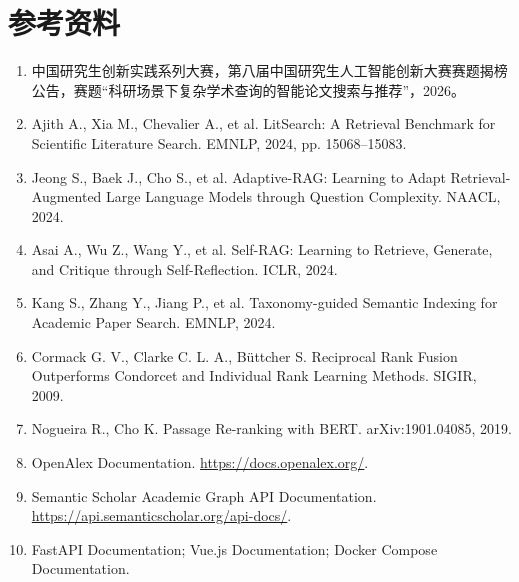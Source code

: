 \documentclass[a4paper,12pt,fontset=none]{ctexart}
\begin{document}
\clearpage
\section{参考资料}
{\small\begin{enumerate}
  \item 中国研究生创新实践系列大赛，第八届中国研究生人工智能创新大赛赛题揭榜公告，赛题“科研场景下复杂学术查询的智能论文搜索与推荐”，2026。
  \item Ajith A., Xia M., Chevalier A., et al. LitSearch: A Retrieval Benchmark for Scientific Literature Search. EMNLP, 2024, pp. 15068--15083.
  \item Jeong S., Baek J., Cho S., et al. Adaptive-RAG: Learning to Adapt Retrieval-Augmented Large Language Models through Question Complexity. NAACL, 2024.
  \item Asai A., Wu Z., Wang Y., et al. Self-RAG: Learning to Retrieve, Generate, and Critique through Self-Reflection. ICLR, 2024.
  \item Kang S., Zhang Y., Jiang P., et al. Taxonomy-guided Semantic Indexing for Academic Paper Search. EMNLP, 2024.
  \item Cormack G. V., Clarke C. L. A., Büttcher S. Reciprocal Rank Fusion Outperforms Condorcet and Individual Rank Learning Methods. SIGIR, 2009.
  \item Nogueira R., Cho K. Passage Re-ranking with BERT. arXiv:1901.04085, 2019.
  \item OpenAlex Documentation. \href{https://docs.openalex.org/}{https://docs.openalex.org/}.
  \item Semantic Scholar Academic Graph API Documentation. \href{https://api.semanticscholar.org/api-docs/}{https://api.semanticscholar.org/api-docs/}.
  \item FastAPI Documentation; Vue.js Documentation; Docker Compose Documentation.
\end{enumerate}}
\end{document}
